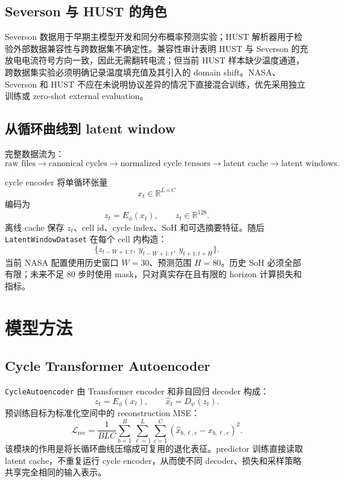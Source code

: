 \documentclass[11pt,a4paper,fontset=none]{ctexart}
\begin{document}
\subsection{Severson 与 HUST 的角色}

Severson 数据用于早期主模型开发和同分布概率预测实验；HUST 解析器用于检验外部数据兼容性与跨数据集不确定性。兼容性审计表明 HUST 与 Severson 的充放电电流符号方向一致，因此无需翻转电流；但当前 HUST 样本缺少温度通道，跨数据集实验必须明确记录温度填充值及其引入的 domain shift。NASA、Severson 和 HUST 不应在未说明协议差异的情况下直接混合训练，优先采用独立训练或 zero-shot external evaluation。

\subsection{从循环曲线到 latent window}

完整数据流为：
\[
\text{raw files}
\rightarrow
\text{canonical cycles}
\rightarrow
\text{normalized cycle tensors}
\rightarrow
\text{latent cache}
\rightarrow
\text{latent windows}.
\]

cycle encoder 将单循环张量
\[
x_t\in\mathbb R^{L\times C}
\]
编码为
\[
z_t=E_\phi(x_t),\qquad z_t\in\mathbb R^{128}.
\]
离线 cache 保存 $z_t$、cell id、cycle index、SoH 和可选摘要特征。随后 \texttt{LatentWindowDataset} 在每个 cell 内构造：
\[
\{z_{t-W+1:t},\ y_{t-W+1:t},\ y_{t+1:t+H}\}.
\]
当前 NASA 配置使用历史窗口 $W=30$、预测范围 $H=80$。历史 SoH 必须全部有限；未来不足 80 步时使用 mask，只对真实存在且有限的 horizon 计算损失和指标。

\section{模型方法}

\subsection{Cycle Transformer Autoencoder}

\texttt{CycleAutoencoder} 由 Transformer encoder 和非自回归 decoder 构成：
\[
z_t=E_\phi(x_t),\qquad
\hat x_t=D_\psi(z_t).
\]
预训练目标为标准化空间中的 reconstruction MSE：
\[
\mathcal L_{\mathrm{rec}}
=
\frac{1}{BLC}
\sum_{b=1}^{B}\sum_{\ell=1}^{L}\sum_{c=1}^{C}
\left(\hat x_{b,\ell,c}-x_{b,\ell,c}\right)^2.
\]
该模块的作用是将长循环曲线压缩成可复用的退化表征。predictor 训练直接读取 latent cache，不重复运行 cycle encoder，从而使不同 decoder、损失和采样策略共享完全相同的输入表示。
\end{document}
